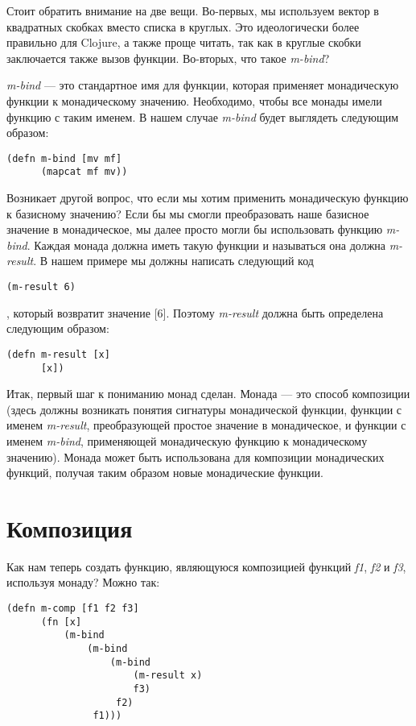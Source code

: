 \documentclass[a4paper,12pt]{article}
\newcommand{\cl}[1] {{\it #1}}
\begin{document}
Стоит обратить внимание на две вещи. Во-первых, мы используем вектор в квадратных скобках вместо
списка в круглых. Это идеологически более правильно для Clojure, а также проще читать, так как в круглые
скобки заключается также вызов функции. Во-вторых, что такое \cl{m-bind}?

\cl{m-bind} --- это стандартное имя для функции, которая применяет монадическую функции к монадическому значению. 
Необходимо, чтобы все монады имели функцию с таким именем. В нашем случае \cl{m-bind} будет выглядеть следующим
образом:

\begin{verbatim}
(defn m-bind [mv mf]
      (mapcat mf mv))
\end{verbatim}

Возникает другой вопрос, что если мы хотим применить монадическую функцию к базисному значению? Если 
бы мы смогли преобразовать наше базисное значение в монадическое, мы далее просто могли бы использовать 
функцию \cl{m-bind}. Каждая монада должна иметь такую функции и называться она должна \cl{m-result}. В нашем
примере мы должны написать следующий код 

\begin{verbatim}
(m-result 6)
\end{verbatim}
, который возвратит значение [6]. Поэтому \cl{m-result} должна быть определена следующим образом:

\begin{verbatim}
(defn m-result [x]
      [x])
\end{verbatim}

Итак, первый шаг к пониманию монад сделан. Монада --- это способ композиции (здесь должны возникать понятия сигнатуры
монадической функции, функции с именем \cl{m-result}, преобразующей простое значение в монадическое, и функции с
именем \cl{m-bind}, применяющей монадическую функцию к монадическому значению). Монада может быть использована
для композиции монадических функций, получая таким образом новые монадические функции. 


\section{Композиция}\label{composing}
Как нам теперь создать функцию, являющуюся композицией функций \cl{f1}, \cl{f2} и \cl{f3}, используя
монаду? Можно так:

\begin{verbatim}
(defn m-comp [f1 f2 f3]
      (fn [x]
          (m-bind
              (m-bind
                  (m-bind
                      (m-result x)
                      f3)
                   f2)
               f1)))
\end{verbatim}
\end{document}
